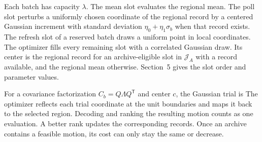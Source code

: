 Each batch has capacity $\lambda$. The mean slot evaluates the regional mean. The poll slot perturbs a uniformly chosen coordinate of the regional record by a centered Gaussian increment with standard deviation $\eta_0+\eta_1\sigma_b$ when that record exists. The refresh slot of a reserved batch draws a uniform point in local coordinates. The optimizer fills every remaining slot with a correlated Gaussian draw. Its center is the regional record for an archive-eligible slot in $\mathcal J_A$ with a record available, and the regional mean otherwise. Section~5 gives the slot order and parameter values.

For a covariance factorization $C_b=Q\Lambda Q^\mathsf{T}$ and center $c$, the Gaussian trial is
The optimizer reflects each trial coordinate at the unit boundaries and maps it back to the selected region. Decoding and ranking the resulting motion counts as one evaluation. A better rank updates the corresponding records. Once an archive contains a feasible motion, its cost can only stay the same or decrease.

